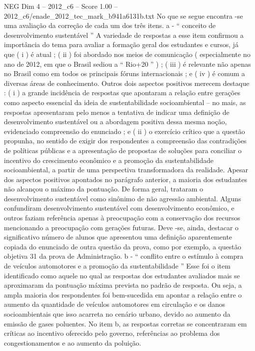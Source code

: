 \begin{textsample}{NEG Dim 4 – 2012\_c6 – Score 1.00 – 2012\_c6/enade\_2012\_tec\_mark\_b941a6131b.txt}
No que se segue encontra -se uma avaliação da correção de cada um dos três itens. a - “ conceito de desenvolvimento sustentável ” A variedade de respostas a esse item confirmou a importância do tema para avaliar a formação geral dos estudantes e cursos, já que ( i ) é atual ; ( ii ) foi abordado nos meios de comunicação ( especialmente no ano de 2012, em que o Brasil sediou a “ Rio+20 ” ) ; ( iii ) é relevante não apenas no Brasil como em todos os principais fóruns internacionais ; e ( iv ) é comum a diversas áreas de conhecimento.
Outros dois aspectos positivos merecem destaque : ( i ) a grande incidência de respostas que apontaram a relação entre gerações como aspecto essencial da ideia de sustentabilidade socioambiental – no mais, as respostas apresentaram pelo menos a tentativa de indicar uma definição de desenvolvimento sustentável ou a abordagem positiva dessa mesma noção, evidenciado compreensão do enunciado ; e ( ii ) o exercício crítico que a questão propunha, no sentido de exigir dos respondentes a compreensão das contradições de políticas públicas e a apresentação de propostas de soluções para conciliar o incentivo do crescimento econômico e a promoção da sustentabilidade socioambiental, a partir de uma perspectiva transformadora da realidade.
Apesar dos aspectos positivos apontados no parágrafo anterior, a maioria dos estudantes não alcançou o máximo da pontuação.
De forma geral, trataram o desenvolvimento sustentável como sinônimo de não agressão ambiental.
Alguns confundiram desenvolvimento sustentável com desenvolvimento econômico, e outros faziam referência apenas à preocupação com a conservação dos recursos mencionando a preocupação com gerações futuras.
Deve -se, ainda, destacar o significativo número de alunos que apresentou uma definição aparentemente copiada do enunciado de outra questão da prova, como por exemplo, a questão objetiva 31 da prova de Administração. b - “ conflito entre o estímulo à compra de veículos automotores e a promoção da sustentabilidade ” Esse foi o item identificado como aquele no qual as respostas dos estudantes avaliados mais se aproximaram da pontuação máxima prevista no padrão de resposta.
Ou seja, a ampla maioria dos respondentes foi bem-sucedida em apontar a relação entre o aumento da quantidade de veículos automotores em circulação e os danos socioambientais que isso acarreta no cenário urbano, devido ao aumento da emissão de gases poluentes.
No item b, as respostas corretas se concentraram em críticas ao incentivo oferecido pelo governo, referências ao problema dos congestionamentos e ao aumento da poluição.

\end{textsample}
